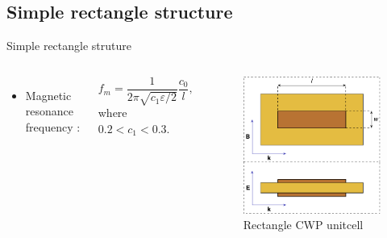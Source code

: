\subsection{Simple rectangle structure}

\begin{frame}{Simple rectangle struture}
    \begin{columns}
        \begin{itemize}
            \item Magnetic resonance frequency \cite{Zhou:06}:
        \end{itemize}
        \begin{equation*}
            f_m = \dfrac{1}{2\pi \sqrt{c_1 \varepsilon/2}} \dfrac{c_0}{l},
        \end{equation*}
        where \( 0.2 < c_1 <0.3\).
        \begin{figure}
            \centering
            \includegraphics[width=\textwidth]{Figures/Rectangle_CWP_unitcell.pdf}
            \caption{Rectangle CWP unitcell}
            \label{fig:Rectangle_CWP_unitcell}
        \end{figure}
    \end{columns}
\end{frame}